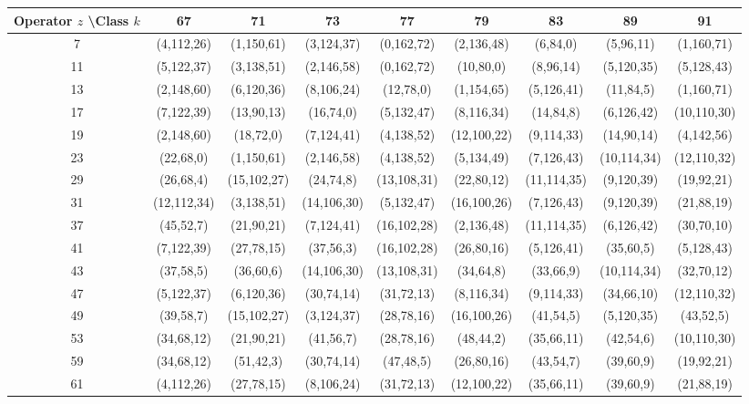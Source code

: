 \documentclass[11pt,a4paper]{article}
\begin{document}
\begin{table}[htbp]
\centering
\tiny
\begin{tabular}{c|cccccccc}
Operator \(z\) \textbackslash Class \(k\) & 67 & 71 & 73 & 77 & 79 & 83 & 89 & 91 \\
\hline
7  & (4,112,26) & (1,150,61) & (3,124,37) & (0,162,72) & (2,136,48) & (6,84,0) & (5,96,11) & (1,160,71) \\
11 & (5,122,37) & (3,138,51) & (2,146,58) & (0,162,72) & (10,80,0) & (8,96,14) & (5,120,35) & (5,128,43) \\
13 & (2,148,60) & (6,120,36) & (8,106,24) & (12,78,0) & (1,154,65) & (5,126,41) & (11,84,5) & (1,160,71) \\
17 & (7,122,39) & (13,90,13) & (16,74,0) & (5,132,47) & (8,116,34) & (14,84,8) & (6,126,42) & (10,110,30) \\
19 & (2,148,60) & (18,72,0) & (7,124,41) & (4,138,52) & (12,100,22) & (9,114,33) & (14,90,14) & (4,142,56) \\
23 & (22,68,0) & (1,150,61) & (2,146,58) & (4,138,52) & (5,134,49) & (7,126,43) & (10,114,34) & (12,110,32) \\
29 & (26,68,4) & (15,102,27) & (24,74,8) & (13,108,31) & (22,80,12) & (11,114,35) & (9,120,39) & (19,92,21) \\
31 & (12,112,34) & (3,138,51) & (14,106,30) & (5,132,47) & (16,100,26) & (7,126,43) & (9,120,39) & (21,88,19) \\
37 & (45,52,7) & (21,90,21) & (7,124,41) & (16,102,28) & (2,136,48) & (11,114,35) & (6,126,42) & (30,70,10) \\
41 & (7,122,39) & (27,78,15) & (37,56,3) & (16,102,28) & (26,80,16) & (5,126,41) & (35,60,5) & (5,128,43) \\
43 & (37,58,5) & (36,60,6) & (14,106,30) & (13,108,31) & (34,64,8) & (33,66,9) & (10,114,34) & (32,70,12) \\
47 & (5,122,37) & (6,120,36) & (30,74,14) & (31,72,13) & (8,116,34) & (9,114,33) & (34,66,10) & (12,110,32) \\
49 & (39,58,7) & (15,102,27) & (3,124,37) & (28,78,16) & (16,100,26) & (41,54,5) & (5,120,35) & (43,52,5) \\
53 & (34,68,12) & (21,90,21) & (41,56,7) & (28,78,16) & (48,44,2) & (35,66,11) & (42,54,6) & (10,110,30) \\
59 & (34,68,12) & (51,42,3) & (30,74,14) & (47,48,5) & (26,80,16) & (43,54,7) & (39,60,9) & (19,92,21) \\
61 & (4,112,26) & (27,78,15) & (8,106,24) & (31,72,13) & (12,100,22) & (35,66,11) & (39,60,9) & (21,88,19) \\

\end{tabular}
\end{table}
\end{document}
